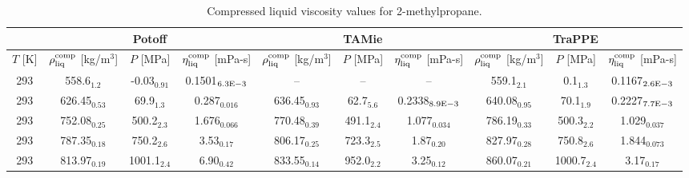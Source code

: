 \documentclass[preprint,review,11pt]{elsarticle}
\begin{document}
\begin{landscape}
	\begin{table}[H]
		\caption{Compressed liquid viscosity values for 2-methylpropane.}
		\begin{center}
			\begin{tabular}{|c|c|c|c|c|c|c|c|c|c|}
				\hline
				& \multicolumn{3}{c|}{Potoff}                                                                          & \multicolumn{3}{c|}{TAMie}                                                                              & \multicolumn{3}{c|}{TraPPE}                                                                          \\ \hline
				$T$ {[}K{]} & $\rho^{\rm comp}_{\rm liq}$ {[}kg/m$^3${]} & $P$ {[}MPa{]}  & $\eta^{\rm comp}_{\rm liq}$ {[}mPa-s{]} & $\rho^{\rm comp}_{\rm liq}$ {[}kg/m$^3${]} & $P$ {[}MPa{]}     & $\eta^{\rm comp}_{\rm liq}$ {[}mPa-s{]} & $\rho^{\rm comp}_{\rm liq}$ {[}kg/m$^3${]} & $P$ {[}MPa{]}  & $\eta^{\rm comp}_{\rm liq}$ {[}mPa-s{]} \\ \hline
				293         & 558.6$_{1.2}$                              & -0.03$_{0.91}$ & 0.1501$_{6.3 \rm E-3}$                      & --                          & -- & --                     & 559.1$_{2.1}$                          & 0.1$_{1.3}$    & 0.1167$_{2.6 \rm E-3}$                      \\ \hline
				293         & 626.45$_{0.53}$                            & 69.9$_{1.3}$   & 0.287$_{0.016}$                        & 636.45$_{0.93}$                         & 62.7$_{5.6}$      & 0.2338$_{8.9 \rm E-3}$                      & 640.08$_{0.95}$                         & 70.1$_{1.9}$   & 0.2227$_{7.7 \rm E-3}$                      \\ \hline
				293         & 752.08$_{0.25}$                            & 500.2$_{2.3}$  & 1.676$_{0.066}$                        & 770.48$_{0.39}$                         & 491.1$_{2.4}$     & 1.077$_{0.034}$                        & 786.19$_{0.33}$                         & 500.3$_{2.2}$  & 1.029$_{0.037}$                        \\ \hline
				293         & 787.35$_{0.18}$                            & 750.2$_{2.6}$  & 3.53$_{0.17}$                          & 806.17$_{0.25}$                         & 723.3$_{2.5}$     & 1.87$_{0.20}$                          & 827.97$_{0.28}$                         & 750.8$_{2.6}$  & 1.844$_{0.073}$                        \\ \hline
				293         & 813.97$_{0.19}$                            & 1001.1$_{2.4}$ & 6.90$_{0.42}$                          & 833.55$_{0.14}$                         & 952.0$_{2.2}$     & 3.25$_{0.12}$                          & 860.07$_{0.21}$                         & 1000.7$_{2.4}$ & 3.17$_{0.17}$                          \\ \hline
			\end{tabular}
		\end{center}
	\end{table}


\end{landscape}
\end{document}
